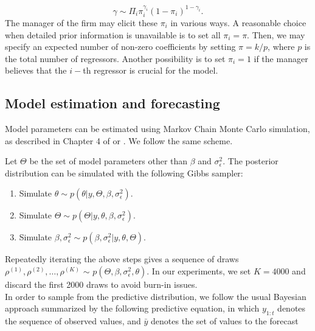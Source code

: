 $$
\gamma \sim \Pi_i \pi_i^{\gamma_i}(1-\pi_i)^{1-\gamma_i}.
$$
The manager of the firm may elicit these $\pi_i$ in various ways. A reasonable choice when detailed prior information is unavailable is to set all $\pi_i = \pi$. Then, we may specify an expected number of non-zero coefficients by setting $\pi = k/p$, where $p$ is the total number of regressors. Another possibility is to set $\pi_i = 1$ if the manager believes that the $i-$th regressor is crucial for the model. %

\subsection{Model estimation and forecasting}\label{s:MCMC}

Model parameters can be estimated using Markov Chain Monte Carlo simulation, as described in Chapter 4 of \cite{petris2009dynamic} or \cite{scott2014predicting}. We follow the same scheme.

Let $\Theta$ be the set of model parameters other than $\beta$ and $\sigma^2_{\epsilon}$. The posterior distribution can be simulated with the following Gibbs sampler: %

\begin{enumerate}
\item Simulate $\theta \sim p(\theta | y, \Theta, \beta, \sigma^2_{\epsilon})$.
\item Simulate $\Theta \sim p(\Theta | y, \theta, \beta, \sigma^2_{\epsilon})$.
\item Simulate $\beta, \sigma^2_{\epsilon} \sim p(\beta, \sigma^2_{\epsilon} | y, \theta, \Theta)$.
\end{enumerate}
Repeatedly iterating the above steps gives a sequence of draws $\rho^{(1)}, \rho^{(2)}, \ldots, \rho^{(K)}$ $\sim$ $p(\Theta, \beta, \sigma^2_{\epsilon}, \theta)$. In our experiments, we set $K = 4000$ and discard the first 2000 draws to avoid burn-in issues. \\

In order to sample from the predictive distribution, we follow the usual Bayesian approach summarized by the following predictive equation, in which $y_{1:t}$ denotes the sequence of observed values, and $\bar{y}$ denotes the set of values to the forecast

